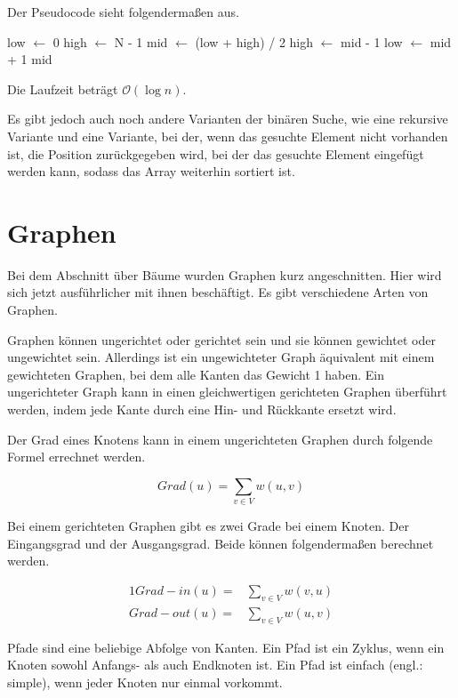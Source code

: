 \documentclass[10pt,a4paper,oneside,ngerman,numbers=noenddot]{scrartcl}
\begin{document}
	Der Pseudocode sieht folgendermaßen aus.
	
	\begin{algorithmic}[1]
			\State low $\gets$ 0
			\State high $\gets$ N - 1
				\State mid $\gets$ (low + high) / 2
					\State high $\gets$ mid - 1
					 \State low $\gets$ mid + 1
				\Else
					\State \Return mid
				\EndIf
			\EndWhile
		\EndFunction
	\end{algorithmic}
	
	Die Laufzeit beträgt $\mathcal{O}(\log n)$.
	
	Es gibt jedoch auch noch andere Varianten der binären Suche, wie eine rekursive Variante und eine Variante, bei der, wenn das gesuchte Element nicht vorhanden ist, die Position zurückgegeben wird, bei der das gesuchte Element eingefügt werden kann, sodass das Array weiterhin sortiert ist.
	
\section{Graphen}

	Bei dem Abschnitt über Bäume wurden Graphen kurz angeschnitten. Hier wird sich jetzt ausführlicher mit ihnen beschäftigt. Es gibt verschiedene Arten von Graphen.
	
	Graphen können ungerichtet oder gerichtet sein und sie können gewichtet oder ungewichtet sein. Allerdings ist ein ungewichteter Graph äquivalent mit einem gewichteten Graphen, bei dem alle Kanten das Gewicht 1 haben. Ein ungerichteter Graph kann in einen gleichwertigen gerichteten Graphen überführt werden, indem jede Kante durch eine Hin- und Rückkante ersetzt wird.
	
	Der Grad eines Knotens kann in einem ungerichteten Graphen durch folgende Formel errechnet werden.
	
	\[
		Grad(u) = \sum\limits_{v \in V} w(u, v)
	\]
	
	Bei einem gerichteten Graphen gibt es zwei Grade bei einem Knoten. Der Eingangsgrad und der Ausgangsgrad. Beide können folgendermaßen berechnet werden.
	
	\begin{alignat*}{1}
		Grad-in(u) =& \sum\limits_{v \in V} w(v, u) \\
		Grad-out(u) =& \sum\limits_{v \in V} w(u, v)
	\end{alignat*}
	
	Pfade sind eine beliebige Abfolge von Kanten. Ein Pfad ist ein Zyklus, wenn ein Knoten sowohl Anfangs- als auch Endknoten ist. Ein Pfad ist einfach (engl.: simple), wenn jeder Knoten nur einmal vorkommt.
	
\end{document}
